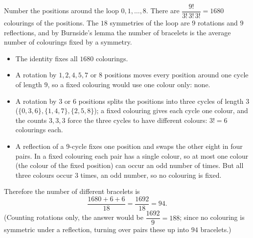 Number the positions around the loop $0,1,\dots,8$. There are $\dfrac{9!}{3!\,3!\,3!}=1680$ colourings of the positions. The $18$ symmetries of the loop are $9$ rotations and $9$ reflections, and by Burnside's lemma the number of bracelets is the average number of colourings fixed by a symmetry.
\begin{itemize}
\item The identity fixes all $1680$ colourings.
\item A rotation by $1,2,4,5,7$ or $8$ positions moves every position around one cycle of length $9$, so a fixed colouring would use one colour only: none.
\item A rotation by $3$ or $6$ positions splits the positions into three cycles of length $3$ ($\{0,3,6\},\{1,4,7\},\{2,5,8\}$); a fixed colouring gives each cycle one colour, and the counts $3,3,3$ force the three cycles to have different colours: $3!=6$ colourings each.
\item A reflection of a $9$-cycle fixes one position and swaps the other eight in four pairs. In a fixed colouring each pair has a single colour, so at most one colour (the colour of the fixed position) can occur an odd number of times. But all three colours occur $3$ times, an odd number, so no colouring is fixed.
\end{itemize}
Therefore the number of different bracelets is
\[\dfrac{1680+6+6}{18}=\dfrac{1692}{18}=\boxed{94}.\]
(Counting rotations only, the answer would be $\dfrac{1692}{9}=188$; since no colouring is symmetric under a reflection, turning over pairs these up into $94$ bracelets.)
